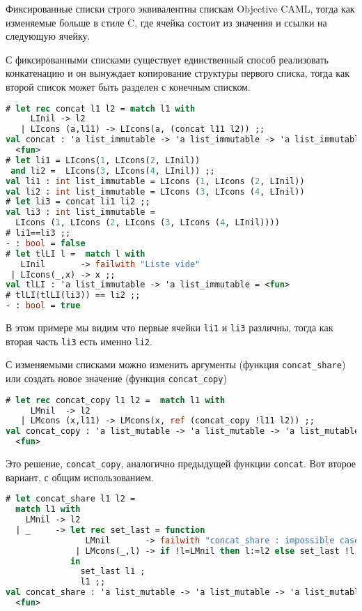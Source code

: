 Фиксированные списки строго эквивалентны спискам Objective CAML, тогда как
изменяемые больше в стиле C, где ячейка состоит из значения и ссылки на
следующую ячейку.

С фиксированными списками существует единственный способ реализовать
конкатенацию и он вынуждает копирование структуры первого списка, тогда как
второй список может быть разделен с конечным списком.

\begin{lstlisting}[language=OCaml]
# let rec concat l1 l2 = match l1 with
     LInil -> l2
   | LIcons (a,l11) -> LIcons(a, (concat l11 l2)) ;;
val concat : 'a list_immutable -> 'a list_immutable -> 'a list_immutable =
  <fun>
# let li1 = LIcons(1, LIcons(2, LInil))
 and li2 =  LIcons(3, LIcons(4, LInil)) ;;
val li1 : int list_immutable = LIcons (1, LIcons (2, LInil))
val li2 : int list_immutable = LIcons (3, LIcons (4, LInil))
# let li3 = concat li1 li2 ;;
val li3 : int list_immutable =
  LIcons (1, LIcons (2, LIcons (3, LIcons (4, LInil))))
# li1==li3 ;;
- : bool = false
# let tlLI l =  match l with
   LInil       -> failwith "Liste vide"
 | LIcons(_,x) -> x ;;
val tlLI : 'a list_immutable -> 'a list_immutable = <fun>
# tlLI(tlLI(li3)) == li2 ;;
- : bool = true
\end{lstlisting}

В этом примере мы видим что первые ячейки \texttt{li1} и \texttt{li3} различны,
тогда как вторая часть \texttt{li3} есть именно \texttt{li2}.

С изменяемыми списками можно изменить аргументы (функция \texttt{concat\_share})
или создать новое значение (функция \texttt{concat\_copy})

\begin{lstlisting}[language=OCaml]
# let rec concat_copy l1 l2 =  match l1 with
     LMnil  -> l2
   | LMcons (x,l11) -> LMcons(x, ref (concat_copy !l11 l2)) ;;
val concat_copy : 'a list_mutable -> 'a list_mutable -> 'a list_mutable =
  <fun>
\end{lstlisting}

Это решение, \texttt{concat\_copy}, аналогично предыдущей функции
\texttt{concat}. Вот второе вариант, с общим использованием.

\begin{lstlisting}[language=OCaml]
# let concat_share l1 l2 =
  match l1 with
    LMnil -> l2
  | _     -> let rec set_last = function
                LMnil       -> failwith "concat_share : impossible case!!"
              | LMcons(_,l) -> if !l=LMnil then l:=l2 else set_last !l
             in
               set_last l1 ;
               l1 ;;
val concat_share : 'a list_mutable -> 'a list_mutable -> 'a list_mutable =
  <fun>
\end{lstlisting}

